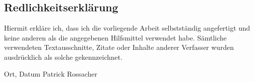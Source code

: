 \newpage
\begin{sffamily}
\section*{Redlichkeitserklärung}

Hiermit erkläre ich, dass ich die vorliegende Arbeit selbstständig angefertigt und keine anderen als die angegebenen Hilfsmittel verwendet habe. Sämtliche verwendeten Textausschnitte, Zitate oder Inhalte anderer Verfasser wurden ausdrücklich als solche gekennzeichnet. 
\vspace{2cm}

\textemdash\textemdash\textemdash\textemdash\textemdash\textemdash
\textemdash\textemdash\textemdash\textemdash\textemdash\textemdash
\hspace{2.2cm}
\textemdash\textemdash\textemdash\textemdash\textemdash\textemdash
\textemdash\textemdash\textemdash\textemdash\textemdash\textemdash
\textemdash\textemdash\textemdash\textemdash\textemdash\textemdash
\newline
Ort, Datum 
\hspace{5cm} 
Patrick Rossacher

\end{sffamily}